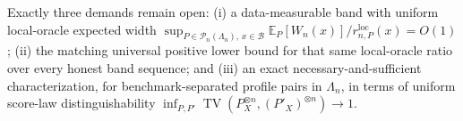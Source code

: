 Exactly three demands remain open: (i) a data-measurable band with uniform local-oracle expected width \(\sup_{P\in\mathcal P_n(\Lambda_n),\,x\in\mathcal B}\mathbb E_P[W_n(x)]/r_{n,P}^{\mathrm{loc}}(x)=O(1)\); (ii) the matching universal positive lower bound for that same local-oracle ratio over every honest band sequence; and (iii) an exact necessary-and-sufficient characterization, for benchmark-separated profile pairs in \(\Lambda_n\), in terms of uniform score-law distinguishability \(\inf_{P,P'}\operatorname{TV}(P_X^{\otimes n},(P'_X)^{\otimes n})\to1\).